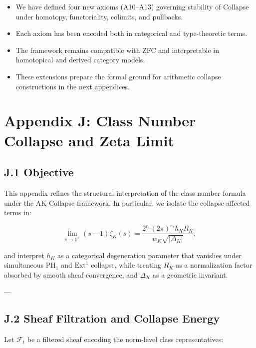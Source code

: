 \documentclass[11pt]{article}
\begin{document}
\begin{itemize}
  \item We have defined four new axioms (A10–A13) governing stability of Collapse under homotopy, functoriality, colimits, and pullbacks.
  \item Each axiom has been encoded both in categorical and type-theoretic terms.
  \item The framework remains compatible with ZFC and interpretable in homotopical and derived category models.
  \item These extensions prepare the formal ground for arithmetic collapse constructions in the next appendices.
\end{itemize}




\section*{Appendix J: Class Number Collapse and Zeta Limit}

\subsection*{J.1 Objective}

This appendix refines the structural interpretation of the class number formula under the AK Collapse framework. In particular, we isolate the collapse-affected terms in:

\[
\lim_{s \to 1^+} (s - 1)\zeta_K(s) = \frac{2^{r_1}(2\pi)^{r_2} h_K R_K}{w_K \sqrt{|\Delta_K|}},
\]

and interpret $h_K$ as a categorical degeneration parameter that vanishes under simultaneous $\mathrm{PH}_1$ and $\mathrm{Ext}^1$ collapse, while treating $R_K$ as a normalization factor absorbed by smooth sheaf convergence, and $\Delta_K$ as a geometric invariant.

---

\subsection*{J.2 Sheaf Filtration and Collapse Energy}

Let $\mathcal{F}_t$ be a filtered sheaf encoding the norm-level class representatives:
\end{document}

